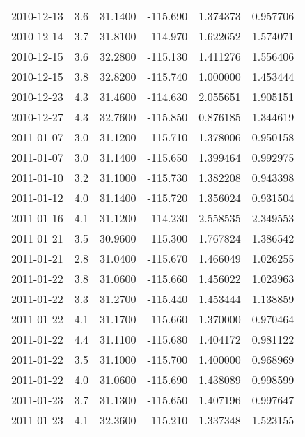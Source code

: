 \begin{tabular}{lrrrrr}
2010-12-13 &       3.6 &  31.1400 &  -115.690 &         1.374373 &         0.957706 \\
2010-12-14 &       3.7 &  31.8100 &  -114.970 &         1.622652 &         1.574071 \\
2010-12-15 &       3.6 &  32.2800 &  -115.130 &         1.411276 &         1.556406 \\
2010-12-15 &       3.8 &  32.8200 &  -115.740 &         1.000000 &         1.453444 \\
2010-12-23 &       4.3 &  31.4600 &  -114.630 &         2.055651 &         1.905151 \\
2010-12-27 &       4.3 &  32.7600 &  -115.850 &         0.876185 &         1.344619 \\
2011-01-07 &       3.0 &  31.1200 &  -115.710 &         1.378006 &         0.950158 \\
2011-01-07 &       3.0 &  31.1400 &  -115.650 &         1.399464 &         0.992975 \\
2011-01-10 &       3.2 &  31.1000 &  -115.730 &         1.382208 &         0.943398 \\
2011-01-12 &       4.0 &  31.1400 &  -115.720 &         1.356024 &         0.931504 \\
2011-01-16 &       4.1 &  31.1200 &  -114.230 &         2.558535 &         2.349553 \\
2011-01-21 &       3.5 &  30.9600 &  -115.300 &         1.767824 &         1.386542 \\
2011-01-21 &       2.8 &  31.0400 &  -115.670 &         1.466049 &         1.026255 \\
2011-01-22 &       3.8 &  31.0600 &  -115.660 &         1.456022 &         1.023963 \\
2011-01-22 &       3.3 &  31.2700 &  -115.440 &         1.453444 &         1.138859 \\
2011-01-22 &       4.1 &  31.1700 &  -115.660 &         1.370000 &         0.970464 \\
2011-01-22 &       4.4 &  31.1100 &  -115.680 &         1.404172 &         0.981122 \\
2011-01-22 &       3.5 &  31.1000 &  -115.700 &         1.400000 &         0.968969 \\
2011-01-22 &       4.0 &  31.0600 &  -115.690 &         1.438089 &         0.998599 \\
2011-01-23 &       3.7 &  31.1300 &  -115.650 &         1.407196 &         0.997647 \\
2011-01-23 &       4.1 &  32.3600 &  -115.210 &         1.337348 &         1.523155 \\

\end{tabular}
